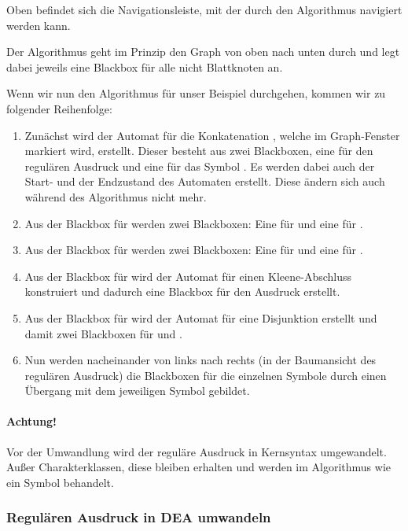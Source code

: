 Oben befindet sich die Navigationsleiste, mit der durch den Algorithmus navigiert werden kann.

Der Algorithmus geht im Prinzip den Graph von oben nach unten durch und legt dabei jeweils eine Blackbox für alle nicht Blattknoten an.

Wenn wir nun den Algorithmus für unser Beispiel durchgehen, kommen wir zu folgender Reihenfolge:
\begin{enumerate}
  \item Zunächst wird der Automat für die Konkatenation , welche im Graph-Fenster markiert wird, erstellt. Dieser besteht aus zwei Blackboxen, eine für den regulären Ausdruck  und eine für das Symbol . Es werden dabei auch der Start- und der Endzustand des Automaten erstellt. Diese ändern sich auch während des Algorithmus nicht mehr.
  \item Aus der Blackbox für  werden zwei Blackboxen: Eine für  und eine für .
  \item Aus der Blackbox für  werden zwei Blackboxen: Eine für  und eine für .
  \item Aus der Blackbox für  wird der Automat für einen Kleene-Abschluss konstruiert und dadurch eine Blackbox für den Ausdruck  erstellt.
  \item Aus der Blackbox für  wird der Automat für eine Disjunktion erstellt und damit zwei Blackboxen für  und .
  \item Nun werden nacheinander von links nach rechts (in der Baumansicht des regulären Ausdruck) die Blackboxen für die einzelnen Symbole durch einen Übergang mit dem jeweiligen Symbol gebildet.
\end{enumerate}

\paragraph*{Achtung!} Vor der Umwandlung wird der reguläre Ausdruck in Kernsyntax umgewandelt. Außer Charakterklassen, diese bleiben erhalten und werden im Algorithmus wie ein Symbol behandelt.

\subsubsection{Regulären Ausdruck in DEA umwandeln}

